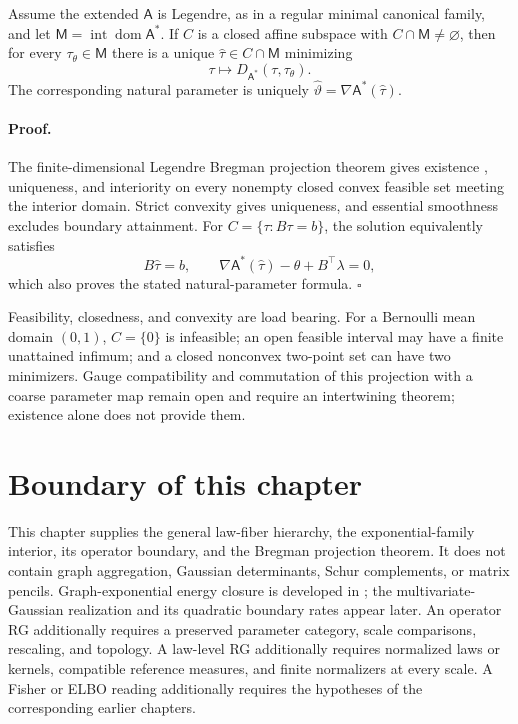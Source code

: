 Assume the extended \(\mathsf A\) is Legendre, as in a regular minimal
canonical family, and let
\(\mathsf M=\operatorname{int}\operatorname{dom}\mathsf A^\ast\).
If \(C\) is a closed affine subspace with
\(C\cap\mathsf M\neq\varnothing\), then for every
\(\tau_\theta\in\mathsf M\) there is a unique
\(\widehat\tau\in C\cap\mathsf M\) minimizing
\begin{equation}
\tau\longmapsto
D_{\mathsf A^\ast}(\tau,\tau_\theta).
\label{eq:exp-mean-projection}
\end{equation}
The corresponding natural parameter is uniquely
\(\widehat\vartheta=\nabla\mathsf A^\ast(\widehat\tau)\).

\paragraph{Proof.}
The finite-dimensional Legendre Bregman projection theorem gives existence
\citep{Bauschke2003},
uniqueness, and interiority on every nonempty closed convex feasible set
meeting the interior domain. Strict convexity gives uniqueness, and essential
smoothness excludes boundary attainment. For
\(C=\{\tau:B\tau=b\}\), the solution equivalently satisfies
\begin{equation}
B\widehat\tau=b,\qquad
\nabla\mathsf A^\ast(\widehat\tau)-\theta+B^\top\lambda=0,
\label{eq:exp-projection-kkt}
\end{equation}
which also proves the stated natural-parameter formula. \(\square\)

Feasibility, closedness, and convexity are load bearing. For a Bernoulli mean
domain \((0,1)\), \(C=\{0\}\) is infeasible; an open feasible interval may
have a finite unattained infimum; and a closed nonconvex two-point set can
have two minimizers. Gauge compatibility and commutation of this projection
with a coarse parameter map remain open and require an intertwining theorem;
existence alone does not provide them. 

\section{Boundary of this chapter}
\label{sec:exp-downstream-assumptions}

This chapter supplies the general law-fiber hierarchy, the exponential-family
interior, its operator boundary, and the Bregman projection theorem. It does
not contain graph aggregation, Gaussian determinants, Schur complements, or
matrix pencils. Graph-exponential energy closure is developed in
; the multivariate-Gaussian realization and its
quadratic boundary rates appear later. An operator RG additionally requires
a preserved parameter category, scale comparisons, rescaling, and topology.
A law-level RG additionally requires normalized laws or kernels, compatible
reference measures, and finite normalizers at every scale. A Fisher or ELBO
reading additionally requires the hypotheses of the corresponding earlier
chapters. 
